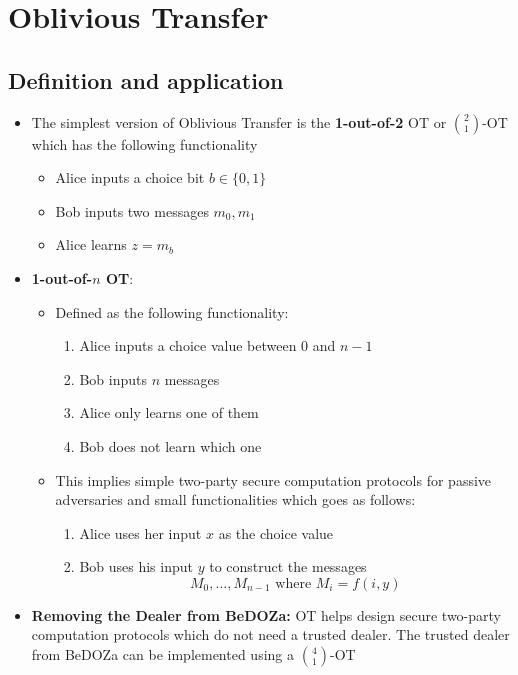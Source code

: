 \section{Oblivious Transfer}
\localtableofcontents
\subsection{Definition and application}%
\begin{itemize}
    \item The simplest version of Oblivious Transfer is the \textbf{1-out-of-2} OT or $2 \choose 1$-OT which has the following functionality
    \begin{itemize}
        \item Alice inputs a choice bit $b \in \{0,1\}$
        \item Bob inputs two messages $m_0, m_1$ 
        \item Alice learns $z = m_b$
    \end{itemize}
    \item \textbf{1-out-of-$n$ OT}: 
    \begin{itemize}
        \item Defined as the following functionality:
        \begin{enumerate}
            \item Alice inputs a choice value between $0$ and $n-1$
            \item Bob inputs $n$ messages 
            \item Alice only learns one of them 
            \item Bob does not learn which one
        \end{enumerate}
        \item This implies simple two-party secure computation protocols for passive adversaries and small functionalities which goes as follows:
        \begin{enumerate}
            \item Alice uses her input $x$ as the choice value
            \item Bob uses his input $y$ to construct the messages 
            \begin{equation*}
                M_0, \dots, M_{n-1} \text{ where } M_i = f(i,y)
            \end{equation*}
        \end{enumerate}
    \end{itemize}
    \item \textbf{Removing the Dealer from BeDOZa:} OT helps design secure two-party computation protocols which do not need a trusted dealer. The trusted dealer from BeDOZa can be implemented using a $4 \choose 1$-OT

\end{itemize}
